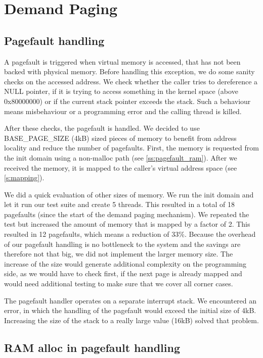 \section{Demand Paging}\label{s:paging}

\subsection{Pagefault handling}

A pagefault is triggered when virtual memory is accessed, that has not been 
backed with physical memory. Before handling this exception, we do some sanity 
checks on the accessed address. We check whether the caller tries to 
dereference a NULL pointer, if it is trying to access something in the kernel 
space (above 0x80000000) or if the current stack pointer exceeds the stack. 
Such a behaviour means misbehaviour or a programming error and the calling 
thread is killed.
\medskip

After these checks, the pagefault is handled. We decided to use 
BASE\_PAGE\_SIZE (4kB) sized pieces of memory to benefit from address locality 
and reduce the number of pagefaults. First, the memory is requested from the 
init domain using a non-malloc path (see \autoref{ss:pagefault_ram}). After we 
received the memory, it is mapped to the caller's virtual address space (see 
\autoref{s:mapping}).
\medskip

We did a quick evaluation of other sizes of memory. We run the init domain and 
let it run our test suite and create 5 threads. This resulted in a total of 18 
pagefaults (since the start of the demand paging mechanism). We repeated the 
test but increased the amount of memory that is mapped by a factor of 2. This 
resulted in 12 pagefaults, which means a reduction of 33\%. Because the 
overhead of our pagefault handling is no bottleneck to the system and the 
savings are therefore not that big, we did not implement the larger memory 
size. The increase of the size would generate additional complexity on the 
programming side, as we would have to check first, if the next page is already 
mapped and would need additional testing to make sure that we cover all corner 
cases.
\medskip

The pagefault handler operates on a separate interrupt stack. We encountered an error, in 
which the handling of the pagefault would exceed the initial size of 4kB. 
Increasing the size of the stack to a really large value (16kB) solved that 
problem.

\subsection{RAM alloc in pagefault handling}\label{ss:pagefault_ram}

